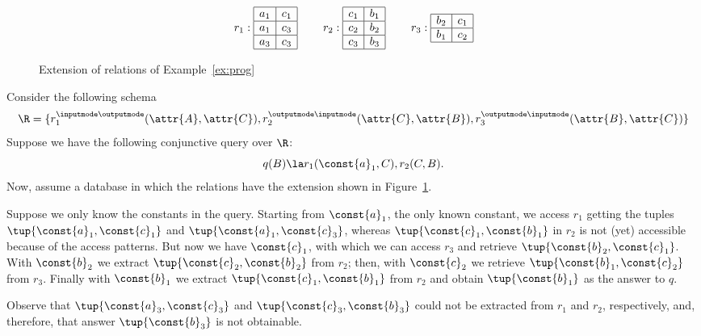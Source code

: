 \begin{figure}[t]\label{fig:exten}
    \[
        r_1:
        \begin{array}{|c|c|}
            \hline
            a_1 & c_1 \\ \hline
            a_1 & c_3 \\ \hline
            a_3 & c_3 \\ \hline
        \end{array}
        \hspace*{8mm}
        r_2:
        \begin{array}{|c|c|}
            \hline
            c_1 & b_1 \\ \hline
            c_2 & b_2 \\ \hline
            c_3 & b_3 \\ \hline
        \end{array}
        \hspace*{8mm}
        r_3:
        \begin{array}{|c|c|}
            \hline
            b_2 & c_1 \\ \hline
            b_1 & c_2 \\ \hline
        \end{array}
    \]
    \caption{Extension of relations of Example~\ref{ex:prog}}
\end{figure}

\begin{example}\label{ex:prog}
Consider the following schema
\[
    \R = \{ r_1^{\inputmode\outputmode}(\attr{A},\attr{C}),
            r_2^{\outputmode\inputmode}(\attr{C},\attr{B}),
            r_3^{\outputmode\inputmode}(\attr{B},\attr{C}) \}
\]
Suppose we have the following conjunctive query over $\R$:
\[
    q(B) \la r_1(\const{a}_1,C), r_2(C,B).
\]
Now, assume a database in which the relations have the extension shown in
Figure~\ref{fig:exten}.

Suppose we only know the constants in the query. Starting from $\const{a}_1$, the only known constant, we access $r_1$ getting the tuples $\tup{\const{a}_1,\const{c}_1}$ and $\tup{\const{a}_1,\const{c}_3}$, whereas $\tup{\const{c}_1,\const{b}_1}$
in $r_{2}$ is not (yet) accessible because of the access patterns.
But now we have $\const{c}_1$, with which we can access $r_3$ and retrieve
$\tup{\const{b}_2,\const{c}_1}$. With $\const{b}_2$ we extract
$\tup{\const{c}_2,\const{b}_2}$ from $r_2$; then, with $\const{c}_2$ we
retrieve $\tup{\const{b}_1,\const{c}_2}$ from $r_{3}$.
Finally with $\const{b}_1$ we extract $\tup{\const{c}_1,\const{b}_1}$ from $r_{2}$ and obtain $\tup{\const{b}_1}$ as the answer to $q$. 

Observe that $\tup{\const{a}_3,\const{c}_3}$ and $\tup{\const{c}_3,\const{b}_3}$ could not be extracted from $r_1$ and $r_2$, respectively, and, therefore, that answer $\tup{\const{b}_3}$ is not obtainable.
\end{example}

